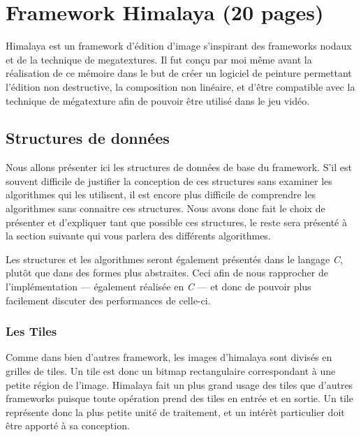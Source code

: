 \chapter{Framework Himalaya (20 pages) }
	Himalaya est un framework d'édition d'image s'inspirant des frameworks nodaux et de la technique de megatextures. Il fut conçu par moi même avant la
	réalisation de ce mémoire dans le but de créer un logiciel de peinture permettant l'édition non destructive, la composition non linéaire, et d'être
	compatible avec la technique de mégatexture afin de pouvoir être utilisé dans le jeu vidéo. 


	\section{Structures de données}
		Nous allons présenter ici les structures de données de base du framework. S'il est souvent difficile de justifier la conception de ces structures
		sans examiner les algorithmes qui les utilisent, il est encore plus difficile de comprendre les algorithmes sans connaitre ces structures.
		Nous avons donc fait le choix de présenter et d'expliquer tant que possible ces structures, le reste sera présenté à la section suivante qui
		vous parlera des différents algorithmes.

		Les structures et les algorithmes seront également présentés dans le langage \emph{C}, plutôt que dans des formes plus abstraites. Ceci afin de nous
		rapprocher de l'implémentation --- également réalisée en \emph{C} --- et donc de pouvoir plus facilement discuter des performances de celle-ci. 

		\subsection{Les Tiles}
		Comme dans bien d'autres framework, les images d'himalaya sont divisés en grilles de tiles. Un tile est donc un bitmap rectangulaire correspondant
		à une petite région de l'image. Himalaya fait un plus grand usage des tiles que d'autres frameworks puisque toute opération prend des tiles
		en entrée et en sortie. Un tile représente donc la plus petite unité de traitement, et un intérèt particulier doit être apporté à sa conception.

